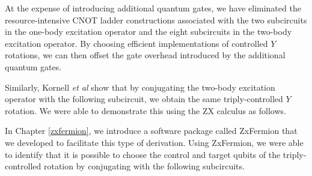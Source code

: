At the expense of introducing additional quantum gates, we have eliminated the resource-intensive CNOT ladder constructions associated with the two subcircuits in the one-body excitation operator and the eight subcircuits in the two-body excitation operator. By choosing efficient implementations of controlled $Y$ rotations, we can then offset the gate overhead introduced by the additional quantum gates.

Similarly, Kornell \textit{et al} \cite{Kornell2023} show that by conjugating the two-body excitation operator with the following subcircuit, we obtain the same triply-controlled $Y$ rotation. We were able to demonstrate this using the ZX calculus as follows.


In Chapter \ref{zxfermion}, we introduce a software package called ZxFermion that we developed to facilitate this type of derivation. Using ZxFermion, we were able to identify that it is possible to choose the control and target qubits of the triply-controlled rotation by conjugating with the following subcircuits.




